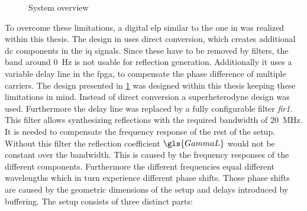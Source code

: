 \documentclass[12pt,a4paper,parskip=full,abstract=true,BCOR=12mm,twoside,open=right]{scrreprt}
\def\device#1{\mbox{\textit{#1}}}
\begin{document}
\begin{figure}[htb]
{
    }
    \caption{System overview}
    \label{fig:overall_hf}
\end{figure}

To overcome these limitations, a digital \gls{elp} similar to the one in
\cite{hashim_active_2008} was realized within this thesis. The design in \cite{hashim_active_2008}
uses direct conversion, which creates additional \gls{dc} components in the \gls{iq}
signals. Since these have to be removed by filters, the band around \SI{0}{\hertz} is
not usable for reflection generation. Additionally it uses a variable delay line in
the \gls{fpga}, to compensate the phase difference of multiple carriers. The design presented in
\cref{fig:overall_hf} was designed within this thesis keeping these limitations in mind. Instead of direct
conversion a superheterodyne design was used. Furthermore the delay line was replaced by
a fully configurable filter \device{fir1}. This filter allows synthesizing reflections with the required bandwidth
of \SI{20}{\mega\hertz}. It is needed to compensate the frequency response of the rest of the setup.
Without this filter the reflection coefficient $\gls{GammaL}$ would not be constant over the bandwidth. This
is caused by the frequency responses of the different components. Furthermore the different frequencies
equal different wavelengths which in turn experience different phase shifts. Those phase shifts are caused by the geometric
dimensions of the setup and delays introduced by buffering.
The setup consists of three distinct parts:
\end{document}
